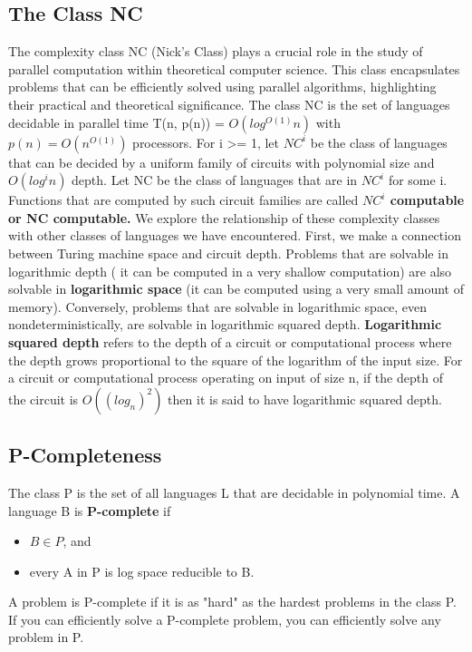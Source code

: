 \documentclass{article}
\begin{document}
\newpage
\subsection{The Class NC}
The complexity class NC (Nick's Class) plays a crucial role in the study of parallel computation within theoretical computer science. This class encapsulates problems that can be efficiently solved using parallel algorithms, highlighting their practical and theoretical significance.
The class NC is the set of languages decidable in parallel time T(n, p(n)) = $O(log^{O(1)} n)$ with $p(n) = O(n^{O(1)})$ processors.
\newline
\newline
For i >= 1, let $NC^i$ be the class of languages that can be decided
by a uniform family of circuits with polynomial size and $O(log^i n)$
depth.
\newline
Let NC be the class of languages that are in $NC^i$ for some i.
\newline
Functions that are computed by such circuit families are called \textbf{$NC^i$
computable or NC computable.}
\newline
\newline
We explore the relationship of these complexity classes with other classes of
languages we have encountered. First, we make a connection between Turing
machine space and circuit depth. Problems that are solvable in logarithmic depth ( it can be computed in a very shallow computation)
are also solvable in \textbf{logarithmic space} (it can be computed using a very small amount of memory). Conversely, problems that are solvable in logarithmic space, even nondeterministically, are solvable in logarithmic squared
depth.
\newline
\newline
\textbf{Logarithmic squared depth} refers to the depth of a circuit or computational process where the depth grows proportional to the square of the logarithm of the input size.
\newline
For a circuit or computational process operating on input of size n, if the depth of the circuit is $O((log_n)^2)$ then it is said to have logarithmic squared depth.
\subsection{P-Completeness}
The class P is the set of all languages L that are decidable in polynomial time.
\newline
\newline
A language B is \textbf{P-complete} if
\begin{itemize}
    \item $B \in P$, and
    \item every A in P is log space reducible to B.
\end{itemize}
A problem is P-complete if it is as "hard" as the hardest problems in the class P. If you can efficiently solve a P-complete problem, you can efficiently solve any problem in P.
\newpage
\end{document}

